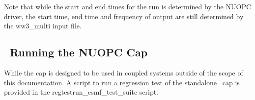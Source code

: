 Note that while the start and end times for the run is determined by the NUOPC driver, the start time, end time and 
frequency of output are still determined by the ww3\_multi input file. 

\vssub
\subsection{~Running the NUOPC Cap} \label{sec:nuopcrun}
\vssub

While the cap is designed to be used in coupled systems outside of the scope of this documentation.  
A script to run a regression test of the standalone \ws\ cap is provided in the {\code regtest\/run\_esmf\_test\_suite}
script. 


